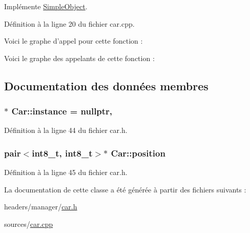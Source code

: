 Implémente \hyperlink{class_simple_object_aedf0ddcc119ab40623b5b69badc9531a}{Simple\-Object}.



Définition à la ligne 20 du fichier car.\-cpp.



Voici le graphe d'appel pour cette fonction \-:




Voici le graphe des appelants de cette fonction \-:




\subsection{Documentation des données membres}
\hypertarget{class_car_a4e8c86d0fa20de2108d524056cf4bc85}{
\subsubsection[{instance}]{ $\ast$ Car\-::instance = nullptr\hspace{0.3cm}{\ttfamily [static]}, {\ttfamily [private]}}}\label{class_car_a4e8c86d0fa20de2108d524056cf4bc85}


Définition à la ligne 44 du fichier car.\-h.

\hypertarget{class_car_a43e9c00e78af10fc998624a811e014df}{
\subsubsection[{position}]{\setlength{\rightskip}{0pt plus 5cm}pair$<$int8\-\_\-t, int8\-\_\-t$>$$\ast$ Car\-::position\hspace{0.3cm}{\ttfamily [private]}}}\label{class_car_a43e9c00e78af10fc998624a811e014df}


Définition à la ligne 45 du fichier car.\-h.



La documentation de cette classe a été générée à partir des fichiers suivants \-:\begin{DoxyCompactItemize}
\item 
headers/manager/\hyperlink{car_8h}{car.\-h}\item 
sources/\hyperlink{car_8cpp}{car.\-cpp}\end{DoxyCompactItemize}
